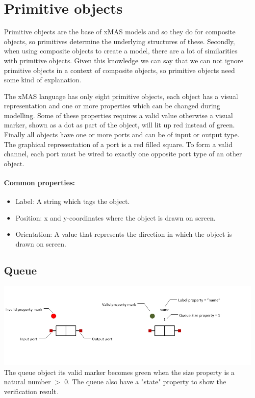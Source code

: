 \documentclass[a4paper,11pt,final]{article}
\begin{document}
\newpage
\section{Primitive objects}
Primitive objects are the base of xMAS models and so they do for composite
objects, so primitives determine the underlying structures of these.
Secondly, when using composite objects to create a model, there are a lot of
similarities with primitive objects. Given this knowledge we can say that
we can not ignore primitive objects in a context of composite objects, so
primitive objects need some kind of explanation.

The xMAS language has only eight primitive objects,
each object has a visual representation and one or more properties which can be
changed during modelling. Some of these properties requires a valid
value otherwise a visual marker, shown as a dot as part of the object, will lit up red instead of
green. Finally all objects have one or more ports and can be of input or output
type. The graphical representation of a port is a red filled square. 
To form a valid channel, each port must be wired to exactly one
opposite port type of an other object.

\paragraph{Common properties:}
\begin{itemize}
\item Label: A string which tags the object.
\item Position: x and y-coordinates where the object is drawn on screen.
\item Orientation: A value that represents the direction in which the object is drawn on screen.
\end{itemize}

\subsection{Queue}
\includegraphics[width=1.0\textwidth]{queue}
The queue object its valid marker becomes green when the size property is a natural number $>$ 0. 
The queue also have a "state" property to show the verification result. 
\end{document}
